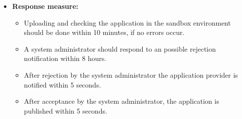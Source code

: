\begin{itemize}
    \item \textbf{Response measure:}
        \begin{itemize}
            \item Uploading and checking the application in the sandbox environment should be done within 10 minutes, if no errors occur.
            \item A system administrator should respond to an possible rejection notification within 8 hours.
            \item After rejection by the system administrator the application provider is notified within 5 seconds.
            \item After acceptance by the system administrator, the application is published within 5 seconds.
        \end{itemize}
\end{itemize}

